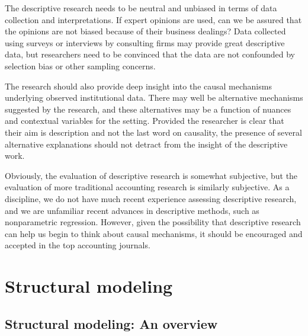 \documentclass[12pt,reqno,titlepage]{amsart}
\theoremstyle{definition}
\begin{document}
\begin{doublespace}
The descriptive research needs to be neutral and unbiased in terms of data collection and interpretations.
If expert opinions are used, can we be assured that the opinions are not biased because of their business dealings?
Data collected using surveys or interviews by consulting firms may provide great descriptive data, but researchers need to be convinced that the data are not confounded by selection bias or other sampling concerns.

The research should also provide deep insight into the causal mechanisms underlying observed institutional data.
There may well be alternative mechanisms suggested by the research, and these alternatives may be a function of nuances and contextual variables for the setting. Provided the researcher is clear that
their aim is description and not the last word on causality, 
the presence of several alternative explanations should not 
detract from the insight of the descriptive work.

Obviously, the evaluation of descriptive research is somewhat subjective, but the evaluation of more traditional accounting research is similarly subjective. 
As a discipline, we do not have much recent experience 
assessing descriptive research, and we are unfamiliar recent
advances in descriptive methods, such as nonparametric regression. 
However, given the possibility that descriptive research can help us begin to think about causal mechanisms, it should be encouraged and accepted in the top accounting journals.

\section{Structural modeling} \label{sec:struct}

\subsection{Structural modeling: An overview}


\end{doublespace}
\end{document}
